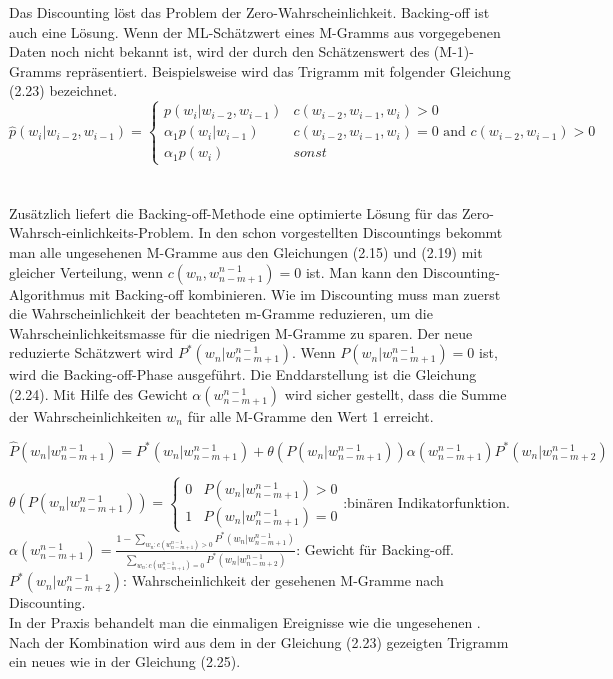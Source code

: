 Das Discounting l\"ost das Problem der Zero-Wahrscheinlichkeit. Backing-off ist auch eine L\"osung. Wenn der ML-Sch\"atzwert eines M-Gramms aus vorgegebenen Daten noch nicht bekannt ist, wird der durch den Sch\"atzenswert des (M-1)-Gramms repr\"asentiert. Beispielsweise wird das Trigramm mit folgender Gleichung (2.23) bezeichnet.
\begin{equation}
\label{equation:backing_off_01}
	\hat{p}(w_{i}|w_{i-2},w_{i-1})=
	\begin{cases}
			p(w_{i}|w_{i-2},w_{i-1}) & c(w_{i-2},w_{i-1},w_{i})>0 \\
			\alpha_{1}p(w_{i}|w_{i-1})& c(w_{i-2},w_{i-1},w_{i})=0 \text{ and } c(w_{i-2},w_{i-1})>0 \\
			\alpha_{1}p(w_{i}) & sonst 
	\end{cases}
\end{equation}
\\
\\
Zus\"atzlich liefert die Backing-off-Methode eine optimierte L\"osung f\"ur das Zero-Wahrsch-einlichkeits-Problem. In den schon vorgestellten Discountings bekommt man alle ungesehenen M-Gramme aus den Gleichungen (2.15) und (2.19) mit gleicher Verteilung, wenn $c(w_{n},w_{n-m+1}^{n-1})=0$ ist. Man kann den Discounting-Algorithmus mit Backing-off kombinieren. Wie im Discounting muss man zuerst die Wahrscheinlichkeit der beachteten m-Gramme reduzieren, um die Wahrscheinlichkeitsmasse f\"ur die niedrigen M-Gramme zu sparen. Der neue  reduzierte Sch\"atzwert wird $P^{*}(w_{n}|w_{n-m+1}^{n-1})$. Wenn $P(w_{n}|w_{n-m+1}^{n-1})=0$ ist, wird die Backing-off-Phase ausgef\"uhrt.  Die Enddarstellung ist die Gleichung (2.24).  Mit  Hilfe des Gewicht $\alpha(w_{n-m+1}^{n-1})$ wird sicher gestellt, dass die Summe der Wahrscheinlichkeiten $w_{n}$ f\"ur alle M-Gramme den Wert 1 erreicht.

\begin{equation}
\label{equation:backing_off_02}
\hat{P}(w_{n}|w_{n-m+1}^{n-1})=P^{*}(w_{n}|w_{n-m+1}^{n-1})+\theta(P(w_{n}|w_{n-m+1}^{n-1}))\alpha(w_{n-m+1}^{n-1})P^{*}(w_{n}|w_{n-m+2}^{n-1})
\end{equation}

$\theta(P(w_{n}|w_{n-m+1}^{n-1}))=\begin{cases} 0 & P(w_{n}|w_{n-m+1}^{n-1})>0 \\ 1 & P(w_{n}|w_{n-m+1}^{n-1})= 0 \end{cases}$:bin\"aren Indikatorfunktion.\\
$\alpha(w_{n-m+1}^{n-1})=\frac{1-\sum_{w_{n}:c(w_{n-m+1}^{n-1})>0}P^{*}(w_{n}|w_{n-m+1}^{n-1})}{\sum_{w_{n}:c(w_{n-m+1}^{n-1})=0}P^{*}(w_{n}|w_{n-m+2}^{n-1})}$: Gewicht f\"ur Backing-off.\\
$P^{*}(w_{n}|w_{n-m+2}^{n-1})$: Wahrscheinlichkeit der gesehenen M-Gramme nach Discounting.\\
In der Praxis behandelt man die einmaligen Ereignisse wie die ungesehenen . Nach der Kombination wird aus dem in der Gleichung (2.23) gezeigten Trigramm ein neues wie in der Gleichung (2.25).

